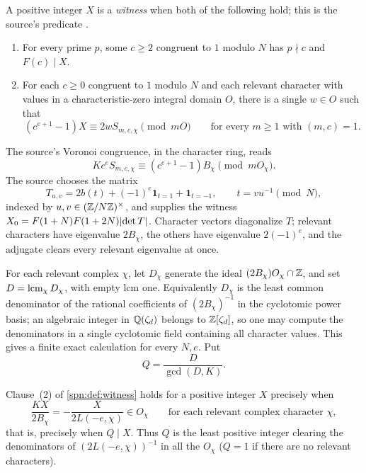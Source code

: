 \begin{definition}\label{spn:def:witness}
A positive integer $X$ is a \emph{witness} when both of the following hold;
this is the source's predicate .
\begin{enumerate}
\item For every prime $p$, some $c\ge2$ congruent to $1$ modulo $N$ has
$p\nmid c$ and $F(c)\mid X$.
\item For each $c\ge0$ congruent to $1$ modulo $N$ and each relevant
character with values in a characteristic-zero integral domain $O$, there is
a single $w\in O$ such that
\begin{equation}\label{spn:eq:stick}
 (c^{e+1}-1)X\equiv2wS_{m,c,\chi}\pmod{mO}
 \qquad\text{for every }m\ge1\text{ with }(m,c)=1 .
\end{equation}
\end{enumerate}
\end{definition}

The source's Voronoi congruence, in the character ring, reads
\begin{equation}\label{spn:eq:voronoi}
 Kc^eS_{m,c,\chi}\equiv(c^{e+1}-1)B_\chi\pmod{mO_\chi}.
\end{equation}
The source chooses the matrix
\[
 T_{u,v}=2b(t)+(-1)^e\mathbf 1_{t=1}+\mathbf 1_{t=-1},\qquad
 t=vu^{-1}\pmod N ,
\]
indexed by $u,v\in(\mathbb{Z}/N\mathbb{Z})^\times$, and supplies the witness
$X_0=F(1+N)F(1+2N)\lvert\det T\rvert$. Character vectors diagonalize $T$; relevant
characters have eigenvalue $2B_\chi$, the others have eigenvalue $2(-1)^e$,
and the adjugate clears every relevant eigenvalue at once.

For each relevant complex $\chi$, let $D_\chi$ generate the ideal
$(2B_\chi)O_\chi\cap\mathbb{Z}$, and set $D=\operatorname{lcm}_\chi D_\chi$, with empty lcm one.
Equivalently $D_\chi$ is the least common denominator of the rational
coefficients of $(2B_\chi)^{-1}$ in the cyclotomic power basis; an algebraic
integer in $\mathbb{Q}(\zeta_d)$ belongs to $\mathbb{Z}[\zeta_d]$, so one may compute the
denominators in a single cyclotomic field containing all character values.
This gives a finite exact calculation for every $N,e$. Put
\begin{equation}\label{spn:eq:Q}
 Q=\frac{D}{\gcd(D,K)} .
\end{equation}

\begin{theorem}\label{spn:thm:second-clause}
Clause~(2) of \cref{spn:def:witness} holds for a positive integer $X$
precisely when
\begin{equation}\label{spn:eq:clause-two}
 \frac{KX}{2B_\chi}=-\frac{X}{2L(-e,\chi)}\in O_\chi
 \qquad\text{for each relevant complex character }\chi ,
\end{equation}
that is, precisely when $Q\mid X$. Thus $Q$ is the least positive integer
clearing the denominators of $(2L(-e,\chi))^{-1}$ in all the $O_\chi$
($Q=1$ if there are no relevant characters).
\end{theorem}

